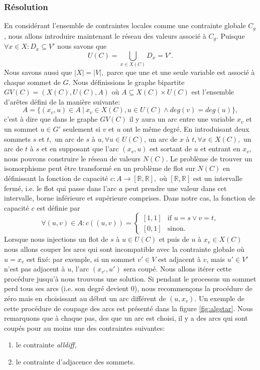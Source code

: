 \documentclass[french]{article}
\theoremstyle{definition}
\theoremstyle{remark}
\begin{document}
\subsubsection{Résolution}
En considérant l'ensemble de contraintes locales comme une contrainte globale $C_g$, nous allons introduire maintenant le réseau des valeurs associé à $C_g$. Puisque $\forall x \in X: D_x \subseteq V'$ nous savons que
$$U(C)=\bigcup_{x \in X(C)} D_x = V'.$$
Nous savons aussi que $|X|=|V|,$ parce que une et une seule variable est associé à chaque sommet de $G$. Nous définissions le graphe bipartite $GV(C)=(X(C), U(C), A)$ où $A \subseteq X(C) \times U(C)$ est l'ensemble d'arêtes défini de la manière suivante:
$$A=\{(x_v, u) \in A\ |\ x_v \in X(C), u \in U(C) \land deg(v)=deg(u) \},$$
c'est à dire que dans le graphe $GV(C)$ il y aura un arc entre une variable $x_v$ et un sommet $u \in G'$ seulement si $v$ et $u$ ont le même degré. 
En introduisant deux sommets $s \text{ et } t,$ un arc  de $s$ à $ u, \forall u \in U(C)$, un arc de $x$ à $t, \forall x \in X(C),$ un arc de $t$ à $s$ et en supposant que l'arc $ (x_v, u) $ est sortant de $u$ et entrant en $x_v$, nous pouvons construire le réseau de valeurs $N(C).$ Le problème de trouver un isomorphisme peut être transformé en un problème de flot sur $N(C)$ en définissant la fonction de capacité $c: A \rightarrow [\mathbb{R}, \mathbb{R}],$ où  $[\mathbb{R}, \mathbb{R}]$ est un intervalle fermé, i.e. le flot qui passe dans l'arc $a$ peut prendre une valeur dans cet intervalle, borne inférieure et supérieure comprises. Dans notre cas, la fonction de capacité $c$ est définie par
\[  \forall (u,v) \in A:
c((u,v))= 
\begin{cases}
[1,1]& \text{if } u=s \lor v=t,\\
[0,1]              & \text{sinon}.
\end{cases}
\]
Lorsque nous injections un flot de $s$ à $u \in U(C)$ et puis de $u$ à $x_v \in X(C)$ nous allons couper les arcs qui sont incompatible avec la contrainte globale où $u=x_v$ est fixé: par exemple, si un sommet $v' \in V$ est adjacent à $v$, mais $u' \in V'$ n'est pas adjacent à $u$, l'arc $(x_{v'},u')$ sera coupé. Nous allons itérer cette procédure jusqu'à nous trouvons une solution. Si pendant le processus un sommet perd tous ses arcs (i.e. son degré devient $0$), nous recommençons la procédure de zéro mais en choisissant au début un arc différent de $(u, x_v).$
Un exemple de cette procédure de coupage des arcs est présenté dans la figure \ref{fig:algstar}. Nous remarquons que à chaque pas, des que un arc est choisi, il y a des arcs qui sont coupés pour au moins une des contraintes suivantes:
\begin{enumerate}
	\item le contrainte \it alldiff, \rm
	\item le contrainte d'adjacence des sommets.
\end{enumerate}
\end{document}
